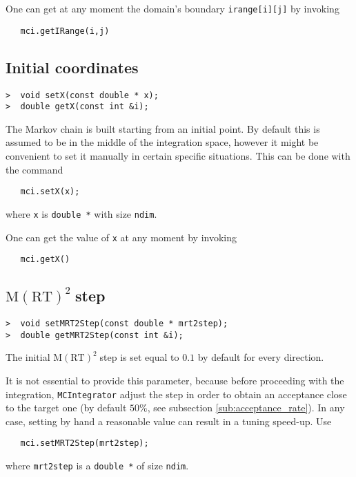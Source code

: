 \documentclass[11pt,a4paper,twoside]{article}
\newcommand{\MRTWO}{$ \text{M}(\text{RT})^2 \;$}
\begin{document}
One can get at any moment the domain's boundary \verb+irange[i][j]+ by invoking
\begin{verbatim}
   mci.getIRange(i,j)
\end{verbatim}


\subsection{Initial coordinates} %
\label{sub:starting_coordinates}

\begin{verbatim}
>  void setX(const double * x);
>  double getX(const int &i);
\end{verbatim}

The Markov chain is built starting from an initial point.
By default this is assumed to be in the middle of the integration space, however it might be convenient to set it manually in certain specific situations.
This can be done with the command
\begin{verbatim}
   mci.setX(x);
\end{verbatim}
where \verb+x+ is \verb+double *+ with size \verb+ndim+.

One can get the value of \verb+x+ at any moment by invoking
\begin{verbatim}
   mci.getX()
\end{verbatim}


\subsection{\MRTWO step} %
\label{sub:mrt2_step}

\begin{verbatim}
>  void setMRT2Step(const double * mrt2step);
>  double getMRT2Step(const int &i);
\end{verbatim}

The initial \MRTWO step is set equal to $0.1$ by default for every direction.

It is not essential to provide this parameter, because before proceeding with the integration, \verb+MCIntegrator+ adjust the step in order to obtain an acceptance close to the target one (by default $50\%$, see subsection \ref{sub:acceptance_rate}).
In any case, setting by hand a reasonable value can result in a tuning speed-up.
Use
\begin{verbatim}
   mci.setMRT2Step(mrt2step);
\end{verbatim}
where \verb+mrt2step+ is a \verb+double *+ of size \verb+ndim+.
\end{document}
